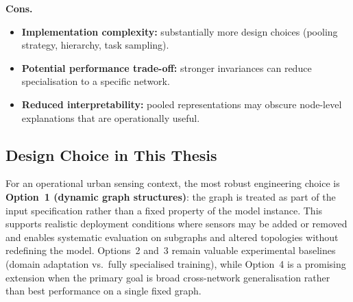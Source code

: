 \textbf{Cons.}
\begin{itemize}
    \item \textbf{Implementation complexity:} substantially more design choices (pooling strategy, hierarchy, task sampling).
    \item \textbf{Potential performance trade-off:} stronger invariances can reduce specialisation to a specific network.
    \item \textbf{Reduced interpretability:} pooled representations may obscure node-level explanations that are operationally useful.
\end{itemize}

\subsection{Design Choice in This Thesis}
\label{subsec:appendix-graph-interface-choice}

For an operational urban sensing context, the most robust engineering choice is \textbf{Option~1 (dynamic graph structures)}: the graph is treated as part of the input specification rather than a fixed property of the model instance. This supports realistic deployment conditions where sensors may be added or removed and enables systematic evaluation on subgraphs and altered topologies without redefining the model. Options~2 and~3 remain valuable experimental baselines (domain adaptation vs.\ fully specialised training), while Option~4 is a promising extension when the primary goal is broad cross-network generalisation rather than best performance on a single fixed graph.
